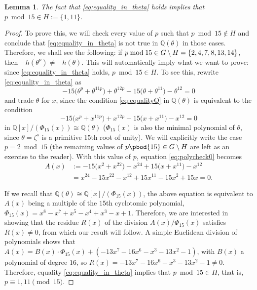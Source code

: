 \documentclass[a4paper, 12pt]{article}
\newtheorem{lemma}[theorem]{Lemma}
\theoremstyle{definition}
\newcommand{\Q}{\ensuremath{\mathbb{Q}}}
\newcommand{\splitatcommas}[1]{%
  \begingroup
  \begingroup\lccode`~=`, \lowercase{\endgroup
    \edef~{\mathchar\the\mathcode`, \penalty0 \noexpand\hspace{0pt plus 1em}}%
  }\mathcode`,="8000 #1%
  \endgroup
}%
\begin{document}
\begin{lemma}
The fact that \eqref{eq:equality_in_theta} holds implies that $p \bmod{15}\in H:=\{1,11\}$.
\end{lemma}
\begin{proof}
To prove this, we will check every value of $p$ such that $p \bmod{15}\notin H$ and conclude that \eqref{eq:equality_in_theta} is not true in $\Q(\theta)$ in those cases. Therefore, we shall see the following: if $p \bmod{15}\in G\setminus H=\splitatcommas{\{2, 4, 7, 8, 13, 14\}}$, then $-h(\theta^p)\neq -h(\theta)$. This will automatically imply what we want to prove: since \eqref{eq:equality_in_theta} holds, $p \bmod{15}\in H$. To see this, rewrite \eqref{eq:equality_in_theta} as
\begin{equation}\label{eq:equalityQ}
-15\big(\theta^{p}+\theta^{11p}\big)+\theta^{12p}+15\big(\theta+\theta^{11}\big)-\theta^{12}=0
\end{equation}
and trade $\theta$ for $x$, since the condition \eqref{eq:equalityQ} in $\Q(\theta)$ is equivalent to the condition
\begin{equation}\label{eq:polycheck0}
-15\big(x^p+x^{11p}\big)+x^{12p}+15\big(x+x^{11}\big)-x^{12}=0
\end{equation}
in $\Q[x]/(\Phi_{15}(x))\cong\Q(\theta)$ ($\Phi_{15}(x)$ is also the minimal polynomial of $\theta$, since $\theta=\zeta^{s}$ is a primitive $15$th root of unity). We will explicitly write the case $p=2 \bmod{15}$ (the remaining values of $p \pbod{15}\in G\setminus H$ are left as an exercise to the reader). With this value of $p$, equation \eqref{eq:polycheck0} becomes
\begin{align*}
A(x)&:=-15\big(x^{2}+x^{22}\big)+x^{24}+15\big(x+x^{11}\big)-x^{12}\\
&=x^{24} - 15 x^{22} - x^{12} + 15 x^{11} - 15 x^{2} + 15 x=0.
\end{align*}

If we recall that $\Q(\theta)\cong\Q[x]/(\Phi_{15}(x))$, the above equation is equivalent to $A(x)$ being a multiple of the $15$th cyclotomic polynomial, $\Phi_{15}(x) = x^{8} - x^{7} + x^{5} - x^{4} + x^{3} - x + 1$. Therefore, we are interested in showing that the residue $R(x)$ of the division $A(x)/\Phi_{15}(x)$ satisfies $R(x)\neq 0$, from which our result will follow. A simple Euclidean division of polynomials shows that $A(x)=B(x)\cdot\Phi_{15}(x)+(-13 x^{7} - 16 x^{6} - x^{3} - 13 x^{2} - 1)$, with $B(x)$ a polynomial of degree $16$, so $R(x)=-13 x^{7} - 16 x^{6} - x^{3} - 13 x^{2} - 1 \neq 0$. Therefore, equality \eqref{eq:equality_in_theta} implies that $p \bmod{15} \in H$, that is, $p\equiv 1,11\pmod{15}$.
\end{proof}
\end{document}
